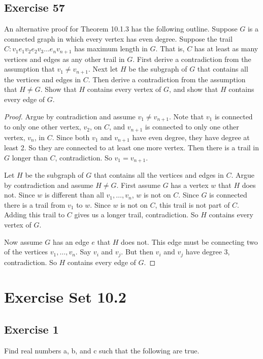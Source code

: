 \documentclass[14pt]{extarticle}
\begin{document}
\subsection{Exercise 57}
An alternative proof for Theorem 10.1.3 has the following outline. Suppose \(G\) is a connected graph in which every
vertex has even degree. Suppose the trail \\ \(C: v_1e_1v_2e_2v_3 \ldots e_nv_{n+1}\) has maximum length in
\(G\). That is, \(C\) has at least as many vertices and edges as any other trail in \(G\). First derive a contradiction from
the assumption that \(v_1 \neq v_{n+1}\). Next let \(H\) be the subgraph of \(G\) that contains all the vertices and edges
in \(C\). Then derive a contradiction from the assumption that \(H \neq G\). Show that \(H\) contains every vertex of \(G\),
and show that \(H\) contains every edge of \(G\).

\begin{proof}
    Argue by contradiction and assume \(v_1 \neq v_{n+1}\). Note that \(v_1\) is connected to only one other vertex, \(v_2\),
    on \(C\), and \(v_{n+1}\) is connected to only one other vertex, \(v_n\), in \(C\). Since both \(v_1\) and \(v_{n+1}\)
    have even degree, they have degree at least 2. So they are connected to at least one more vertex. Then there is a trail
    in \(G\) longer than \(C\), contradiction. So \(v_1 = v_{n+1}\).

    Let \(H\) be the subgraph of \(G\) that contains all the vertices and edges in \(C\). Argue by contradiction and assume
    \(H \neq G\). First assume \(G\) has a vertex \(w\) that \(H\) does not. Since \(w\) is different than all \(v_1, \ldots,
    v_n\), \(w\) is not on \(C\). Since \(G\) is connected there is a trail from \(v_1\) to \(w\). Since \(w\) is not on \(C\),
    this trail is not part of \(C\). Adding this trail to \(C\) gives us a longer trail, contradiction. So \(H\) contains
    every vertex of \(G\).

    Now assume \(G\) has an edge \(e\) that \(H\) does not. This edge must be connecting two of the vertices \(v_1, \ldots,
    v_n\). Say \(v_i\) and \(v_j\). But then \(v_i\) and \(v_j\) have degree 3, contradiction. So \(H\) contains every edge
    of \(G\).
\end{proof}

\section{Exercise Set 10.2}
\subsection{Exercise 1}
Find real numbers a, b, and c such that the following are true.
\end{document}
